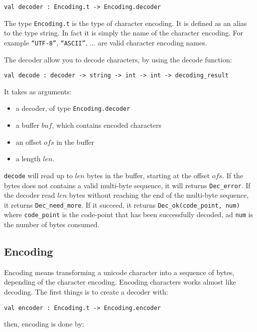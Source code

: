 \documentclass{article}
\begin{document}
\begin{verbatim}
val decoder : Encoding.t -> Encoding.decoder
\end{verbatim}

The type \texttt{Encoding.t} is the type of character encoding. It is
defined as an alias to the type string. In fact it is simply the name
of the character encoding. For example \texttt{``UTF-8''},
\texttt{``ASCII''}, ... are valid character encoding names.

The decoder allow you to decode characters, by using the decode
function:

\begin{verbatim}
val decode : decoder -> string -> int -> int -> decoding_result
\end{verbatim}

It takes as arguments:
\begin{itemize}
\item a decoder, of type \texttt{Encoding.decoder}
\item a buffer $buf$, which contains encoded characters
\item an offset $ofs$ in the buffer
\item a length $len$.
\end{itemize}

\texttt{decode} will read up to $len$ bytes in the buffer, starting at
the offset $ofs$. If the bytes does not contains a valid multi-byte
sequence, it will returns \texttt{Dec\_error}. If the decoder read
$len$ bytes without reaching the end of the multi-byte sequence, it
returns \texttt{Dec\_need\_more}. If it succeed, it returns
\texttt{Dec\_ok(code\_point, num)} where \texttt{code\_point} is the
code-point that has been successfully decoded, ad \texttt{num} is the
number of bytes consumed.

\subsection{Encoding}

Encoding means transforming a unicode character into a sequence of
bytes, depending of the character encoding. Encoding characters works
almost like decoding. The first things is to create a decoder with:

\begin{verbatim}
val encoder : Encoding.t -> Encoding.encoder
\end{verbatim}

then, encoding is done by:
\end{document}
